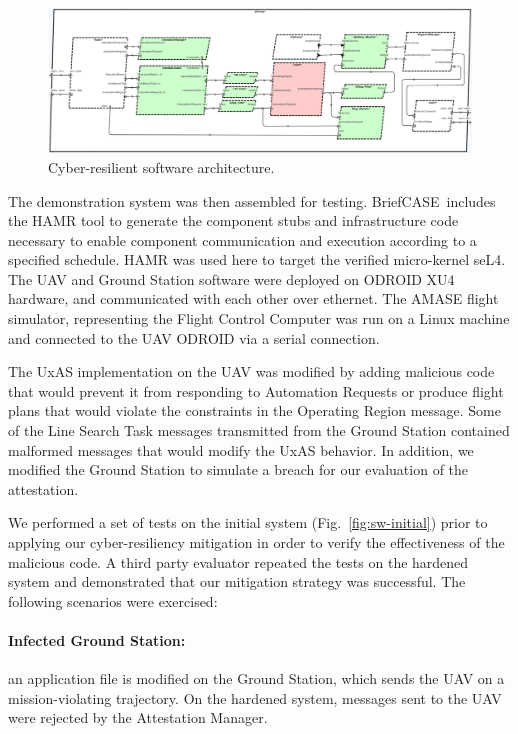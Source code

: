 \documentclass[global,twocolumn]{svjour}
\newcommand{\figref}[1]{Fig.~\ref{#1}}
\newcommand{\brfcs}{BriefCASE}
\begin{document}
\begin{figure}[h]
	\centering
	\includegraphics[width=2\columnwidth]{figs/hardened-sw.png}
	\caption{Cyber-resilient software architecture.}
	\label{fig:hardened-sw}
\end{figure}

The demonstration system was then assembled for testing.
%
\brfcs\ includes the HAMR tool to generate the component stubs and infrastructure code necessary to enable component communication and execution according to a specified schedule.
%
HAMR was used here to target the verified micro-kernel seL4.
%
The UAV and Ground Station software were deployed on ODROID XU4 hardware, and communicated with each other over ethernet.
%
The AMASE flight simulator, representing the Flight Control Computer was run on a Linux machine and connected to the UAV ODROID via a serial connection.

The UxAS implementation on the UAV was modified by adding malicious code that would prevent it from responding to Automation Requests or produce flight plans that would violate the constraints in the Operating Region message.
%
Some of the Line Search Task messages transmitted from the Ground Station contained malformed messages that would modify the UxAS behavior. In addition, we modified the Ground Station to simulate a breach for our evaluation of the attestation.

We performed a set of tests on the initial system (\figref{fig:sw-initial}) prior to applying our cyber-resiliency mitigation in order to verify the effectiveness of the malicious code.
A third party evaluator repeated the tests on the hardened system and demonstrated that our mitigation strategy was successful.
The following scenarios were exercised:

\paragraph{Infected Ground Station:\/} an application file is modified on the Ground Station, which sends the UAV on a mission-violating trajectory.
%
On the hardened system, messages sent to the UAV were rejected by the Attestation Manager.
\end{document}
